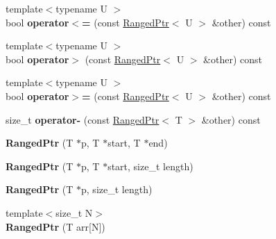 \begin{DoxyCompactItemize}
\item 
\hypertarget{classmozilla_1_1_ranged_ptr_ac5f26a226059da5196a53ce2a188e7f5}{{\footnotesize template$<$typename U $>$ }\\bool {\bfseries operator$<$=} (const \hyperlink{classmozilla_1_1_ranged_ptr}{Ranged\-Ptr}$<$ U $>$ \&other) const }\label{classmozilla_1_1_ranged_ptr_ac5f26a226059da5196a53ce2a188e7f5}

\item 
\hypertarget{classmozilla_1_1_ranged_ptr_a5b00178690366295e553bd953292b15a}{{\footnotesize template$<$typename U $>$ }\\bool {\bfseries operator$>$} (const \hyperlink{classmozilla_1_1_ranged_ptr}{Ranged\-Ptr}$<$ U $>$ \&other) const }\label{classmozilla_1_1_ranged_ptr_a5b00178690366295e553bd953292b15a}

\item 
\hypertarget{classmozilla_1_1_ranged_ptr_a3fccab34766640d37c7ff057147db528}{{\footnotesize template$<$typename U $>$ }\\bool {\bfseries operator$>$=} (const \hyperlink{classmozilla_1_1_ranged_ptr}{Ranged\-Ptr}$<$ U $>$ \&other) const }\label{classmozilla_1_1_ranged_ptr_a3fccab34766640d37c7ff057147db528}

\item 
\hypertarget{classmozilla_1_1_ranged_ptr_a65a2a52794071c6b0e4cede666d64cff}{size\-\_\-t {\bfseries operator-\/} (const \hyperlink{classmozilla_1_1_ranged_ptr}{Ranged\-Ptr}$<$ T $>$ \&other) const }\label{classmozilla_1_1_ranged_ptr_a65a2a52794071c6b0e4cede666d64cff}

\item 
\hypertarget{classmozilla_1_1_ranged_ptr_af1cc2c2befbe1d2ed13ca45042f03525}{{\bfseries Ranged\-Ptr} (T $\ast$p, T $\ast$start, T $\ast$end)}\label{classmozilla_1_1_ranged_ptr_af1cc2c2befbe1d2ed13ca45042f03525}

\item 
\hypertarget{classmozilla_1_1_ranged_ptr_a39c4573511a6f285d94cb643ee1b235c}{{\bfseries Ranged\-Ptr} (T $\ast$p, T $\ast$start, size\-\_\-t length)}\label{classmozilla_1_1_ranged_ptr_a39c4573511a6f285d94cb643ee1b235c}

\item 
\hypertarget{classmozilla_1_1_ranged_ptr_a036291f094200e78a49c54afc4b1ba49}{{\bfseries Ranged\-Ptr} (T $\ast$p, size\-\_\-t length)}\label{classmozilla_1_1_ranged_ptr_a036291f094200e78a49c54afc4b1ba49}

\item 
\hypertarget{classmozilla_1_1_ranged_ptr_ac4911d7d67fe3a1669770788d0e970ed}{{\footnotesize template$<$size\-\_\-t N$>$ }\\{\bfseries Ranged\-Ptr} (T arr\mbox{[}N\mbox{]})}\label{classmozilla_1_1_ranged_ptr_ac4911d7d67fe3a1669770788d0e970ed}


\end{DoxyCompactItemize}
